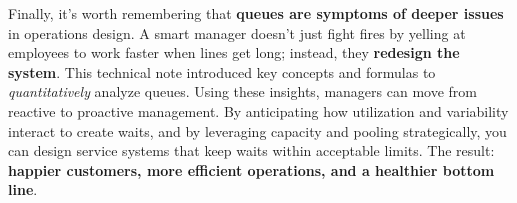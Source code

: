 \documentclass[
  letterpaper,
  DIV=11,
  numbers=noendperiod]{scrartcl}
\begin{document}
Finally, it's worth remembering that \textbf{queues are symptoms of
deeper issues} in operations design. A smart manager doesn't just fight
fires by yelling at employees to work faster when lines get long;
instead, they \textbf{redesign the system}. This technical note
introduced key concepts and formulas to \emph{quantitatively} analyze
queues. Using these insights, managers can move from reactive to
proactive management. By anticipating how utilization and variability
interact to create waits, and by leveraging capacity and pooling
strategically, you can design service systems that keep waits within
acceptable limits. The result: \textbf{happier customers, more efficient
operations, and a healthier bottom line}.
\end{document}
